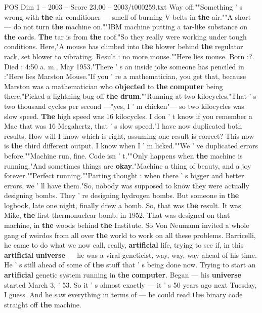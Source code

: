 \begin{textsample}{POS Dim 1 – 2003 – Score 23.00 – 2003/t000259.txt}
Way off.""Something ' s wrong with \textbf{the} air conditioner — smell of burning V-belts in \textbf{the} air.""A short — do not turn \textbf{the} machine on.""IBM machine putting a tar-like substance on \textbf{the} cards. \textbf{The} tar is from \textbf{the} roof."So they really were working under tough conditions.
Here,"A mouse has climbed into \textbf{the} blower behind \textbf{the} regulator rack, set blower to vibrating.
Result : no more mouse.""Here lies mouse.
Born :?.
Died : 4:50 a. m., May 1953."There ' s an inside joke someone has penciled in :"Here lies Marston Mouse."If you ' re a mathematician, you get that, because Marston was a mathematician who \textbf{objected} to \textbf{the} \textbf{computer} being there."Picked a lightning bug off \textbf{the} \textbf{drum}.""Running at two kilocycles."That ' s two thousand cycles per second —"yes, I ' m chicken"— so two kilocycles was slow speed. \textbf{The} high speed was 16 kilocycles.
I don ' t know if you remember a Mac that was 16 Megahertz, that ' s slow speed."I have now duplicated both results.
How will I know which is right, assuming one result is correct?
This now is \textbf{the} third different output.
I know when I ' m licked.""We ' ve duplicated errors before.""Machine run, fine.
Code isn ' t.""Only happens when \textbf{the} machine is running."And sometimes things are \textbf{okay}."Machine a thing of beauty, and a joy forever.""Perfect running.""Parting thought : when there ' s bigger and better errors, we ' ll have them."So, nobody was supposed to know they were actually designing bombs.
They ' re designing hydrogen bombs.
But someone in \textbf{the} logbook, late one night, finally drew a bomb.
So, that was \textbf{the} result.
It was Mike, \textbf{the} first thermonuclear bomb, in 1952.
That was designed on that machine, in \textbf{the} woods behind \textbf{the} Institute.
So Von Neumann invited a whole gang of weirdos from all over \textbf{the} world to work on all these problems.
Barricelli, he came to do what we now call, really, \textbf{artificial} life, trying to see if, in this \textbf{artificial} \textbf{universe} — he was a viral-geneticist, way, way, way ahead of his time.
He ' s still ahead of some of \textbf{the} stuff that ' s being done now.
Trying to start an \textbf{artificial} genetic system running in \textbf{the} \textbf{computer}.
Began — his \textbf{universe} started March 3, ' 53.
So it ' s almost exactly — it ' s 50 years ago next Tuesday, I guess.
And he saw everything in terms of — he could read \textbf{the} binary code straight off \textbf{the} machine.

\end{textsample}
